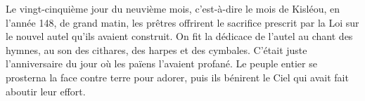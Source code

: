 Le vingt-cinquième jour du neuvième mois, c’est-à-dire le mois de Kisléou,
	en l’année 148, de grand matin,
	les prêtres offrirent le sacrifice prescrit par la Loi
	sur le nouvel autel qu’ils avaient construit.
On fit la dédicace de l’autel au chant des hymnes,
	au son des cithares, des harpes et des cymbales.
C’était juste l’anniversaire du jour où les païens l’avaient profané.
Le peuple entier se prosterna la face contre terre pour adorer,
	puis ils bénirent le Ciel qui avait fait aboutir leur effort.
